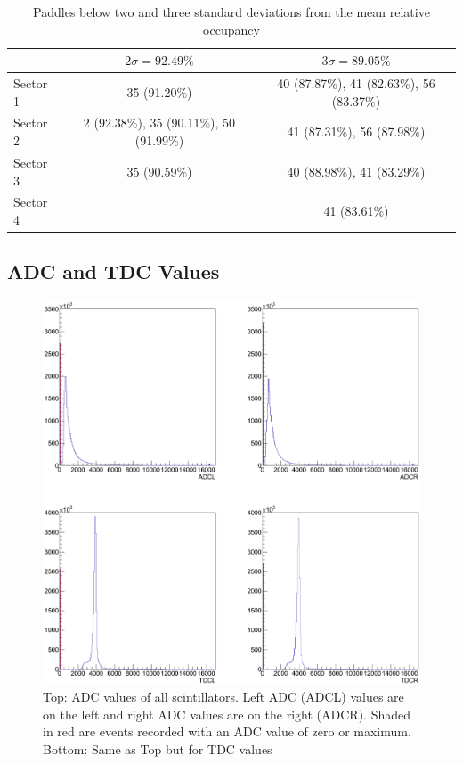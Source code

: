 \begin{table}
\begin{tabular}[!htbp]{l | c | c |}
 &  $2 \sigma = 92.49\%$ &  $3 \sigma = 89.05\%$ \\ 
\hline
Sector 1 & 35 (91.20\%) & 40 (87.87\%), 41 (82.63\%), 56 (83.37\%) \\
Sector 2 & 2 (92.38\%), 35 (90.11\%), 50 (91.99\%) &  41 (87.31\%), 56 (87.98\%)\\
Sector 3 & 35 (90.59\%) & 40 (88.98\%), 41 (83.29\%)\\
Sector 4 &  & 41 (83.61\%) \\
\end{tabular}
\caption{Paddles below two and three standard deviations from the mean relative occupancy}
\label{tab:occp}
\end{table}

\subsection{ADC and TDC Values}


\begin{figure}
    \includegraphics[width=0.70\linewidth]{figures/calib/tof/tofko/adctdcval.eps}
    \caption{Top: ADC values of all scintillators. Left ADC (ADCL) values are on the left and right ADC values are on the right (ADCR). Shaded in red are events recorded with an ADC value of zero or maximum. Bottom: Same as Top but for TDC values}
    \label{plt:adctdcval}
\end{figure}


